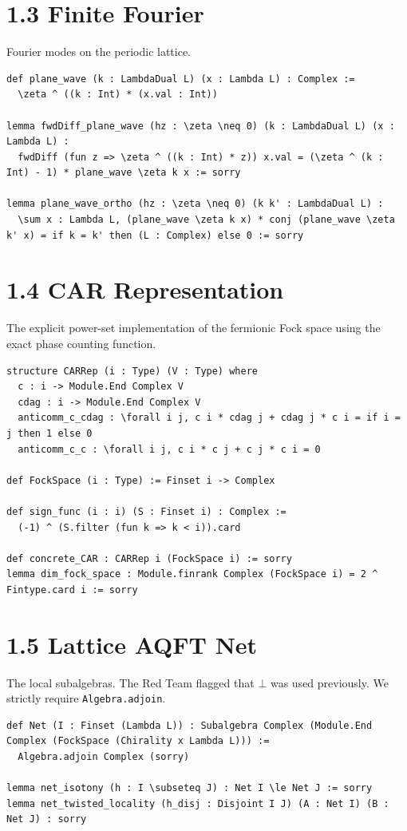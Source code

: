 \documentclass[12pt]{article}
\begin{document}
\section{1.3 Finite Fourier}
Fourier modes on the periodic lattice.
\begin{lstlisting}[language=lean]
def plane_wave (k : LambdaDual L) (x : Lambda L) : Complex :=
  \zeta ^ ((k : Int) * (x.val : Int))

lemma fwdDiff_plane_wave (hz : \zeta \neq 0) (k : LambdaDual L) (x : Lambda L) :
  fwdDiff (fun z => \zeta ^ ((k : Int) * z)) x.val = (\zeta ^ (k : Int) - 1) * plane_wave \zeta k x := sorry

lemma plane_wave_ortho (hz : \zeta \neq 0) (k k' : LambdaDual L) :
  \sum x : Lambda L, (plane_wave \zeta k x) * conj (plane_wave \zeta k' x) = if k = k' then (L : Complex) else 0 := sorry
\end{lstlisting}

\section{1.4 CAR Representation}
The explicit power-set implementation of the fermionic Fock space using the exact phase counting function.
\begin{lstlisting}[language=lean]
structure CARRep (i : Type) (V : Type) where
  c : i -> Module.End Complex V
  cdag : i -> Module.End Complex V
  anticomm_c_cdag : \forall i j, c i * cdag j + cdag j * c i = if i = j then 1 else 0
  anticomm_c_c : \forall i j, c i * c j + c j * c i = 0

def FockSpace (i : Type) := Finset i -> Complex

def sign_func (i : i) (S : Finset i) : Complex :=
  (-1) ^ (S.filter (fun k => k < i)).card

def concrete_CAR : CARRep i (FockSpace i) := sorry
lemma dim_fock_space : Module.finrank Complex (FockSpace i) = 2 ^ Fintype.card i := sorry
\end{lstlisting}

\section{1.5 Lattice AQFT Net}
The local subalgebras. The Red Team flagged that $\bot$ was used previously. We strictly require \texttt{Algebra.adjoin}.
\begin{lstlisting}[language=lean]
def Net (I : Finset (Lambda L)) : Subalgebra Complex (Module.End Complex (FockSpace (Chirality x Lambda L))) :=
  Algebra.adjoin Complex (sorry) 

lemma net_isotony (h : I \subseteq J) : Net I \le Net J := sorry
lemma net_twisted_locality (h_disj : Disjoint I J) (A : Net I) (B : Net J) : sorry
\end{lstlisting}
\end{document}
